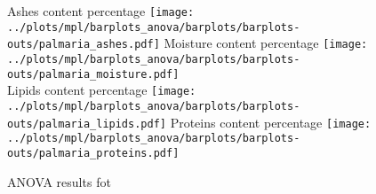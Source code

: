 
\begin{figure}[H]
\centering
	\subcaptionbox%
	{Ashes content percentage\label{subfig:palmaria_ashes}}%
		{\texttt{[image: ../plots/mpl/barplots\_anova/barplots/barplots-outs/palmaria\_ashes.pdf]}}%
\hspace*{\hbtwsfig}%
	\subcaptionbox%
	{Moisture content percentage\label{subfig:palmaria_moisture}}%
		{\texttt{[image: ../plots/mpl/barplots\_anova/barplots/barplots-outs/palmaria\_moisture.pdf]}}%
\\[2ex]
	\subcaptionbox%
	{Lipids content percentage\label{subfig:palmaria_lipids}}%
		{\texttt{[image: ../plots/mpl/barplots\_anova/barplots/barplots-outs/palmaria\_lipids.pdf]}}%
\hspace*{\hbtwsfig}%
	\subcaptionbox%
	{Proteins content percentage\label{subfig:palmaria_proteins}}%
		{\texttt{[image: ../plots/mpl/barplots\_anova/barplots/barplots-outs/palmaria\_proteins.pdf]}}%
\caption%
{ANOVA results fot }
\label{fig:palmariabla}
\end{figure}
